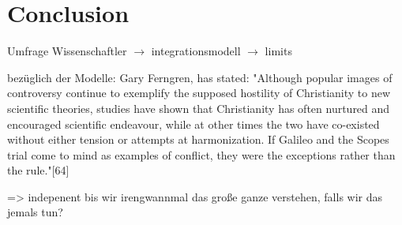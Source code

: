 \section{Conclusion}
\label{sec:Conclusion}

Umfrage Wissenschaftler \(\to\) integrationsmodell \(\to\) limits

bezüglich der Modelle:
Gary Ferngren, has stated: "Although popular images of controversy continue to exemplify the supposed hostility of Christianity to new scientific theories, studies have shown that Christianity has often nurtured and encouraged scientific endeavour, while at other times the two have co-existed without either tension or attempts at harmonization. If Galileo and the Scopes trial come to mind as examples of conflict, they were the exceptions rather than the rule."[64]

=> indepenent bis wir irengwannmal das große ganze verstehen, falls wir das jemals tun?
